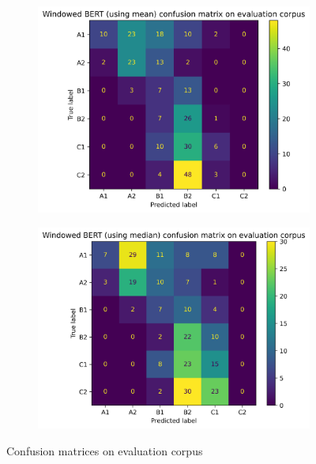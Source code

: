 \documentclass[11pt,a4paper]{article}
\begin{document}
\begin{figure}
\begin{adjustwidth}{-3cm}{-3cm}
\begin{subfigure}{0.6\textwidth}
  \end{subfigure}
  \begin{subfigure}{0.7\textwidth}
    \centering
    \includegraphics[width=1\textwidth]{figures/confusion-matrix-windowed-mean.png}
  \end{subfigure}%
  \begin{subfigure}{0.7\textwidth}
    \centering
    \includegraphics[width=1\textwidth]{figures/confusion-matrix-windowed-median.png}
  \end{subfigure}
  \end{adjustwidth}
  \caption{Confusion matrices on evaluation corpus}
  \label{fig:confusion-matrices}
\end{figure}
\end{document}
